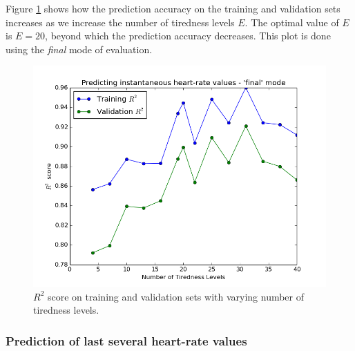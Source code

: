 \documentclass{acm_proc_article-sp}
\begin{document}
Figure \ref{figR2vsTirednessLevels} shows how the prediction accuracy on the training and validation sets increases as we increase the number of tiredness levels $E$. The optimal value of $E$ is $E = 20$, beyond which the prediction accuracy decreases. This plot is done using the \emph{final} mode of evaluation.

\begin{figure}[h]
\centering
\includegraphics[scale=0.4]{../src/plots/r2_vs_num_tiredness_levels}
\caption{\label{figR2vsTirednessLevels} $R^2$ score on training and validation sets with varying number of tiredness levels.}
\end{figure}

\subsubsection{Prediction of last several heart-rate values}
\end{document}
